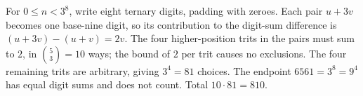For $0\le n<3^8$, write eight ternary digits, padding with zeroes. Each pair $u+3v$ becomes one base-nine digit, so its contribution to the digit-sum difference is $(u+3v)-(u+v)=2v$. The four higher-position trits in the pairs must sum to $2$, in $\binom53=10$ ways; the bound of $2$ per trit causes no exclusions. The four remaining trits are arbitrary, giving $3^4=81$ choices. The endpoint $6561=3^8=9^4$ has equal digit sums and does not count. Total $10\cdot81=\boxed{810}$.
